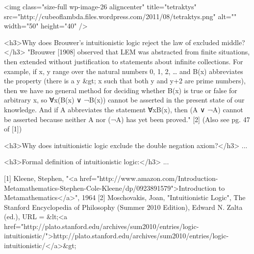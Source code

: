 <img class="size-full wp-image-26 aligncenter" title="tetraktys" src="http://cubeoflambda.files.wordpress.com/2011/08/tetraktys.png" alt="" width="50" height="40" />

<h3>Why does Brouwer's intuitionistic logic reject the law of excluded middle?</h3>
"Brouwer [1908] observed that LEM was abstracted from finite situations, then extended without justification to statements about infinite collections. For example, if x, y range over the natural numbers 0, 1, 2, … and B(x) abbreviates the property (there is a y &gt; x such that both y and y+2 are prime numbers), then we have no general method for deciding whether B(x) is true or false for arbitrary x, so ∀x(B(x) ∨ ¬B(x)) cannot be asserted in the present state of our knowledge. And if A abbreviates the statement ∀xB(x), then (A ∨ ¬A) cannot be asserted because neither A nor (¬A) has yet been proved." [2] (Also see pg. 47 of [1])

<h3>Why does intuitionistic logic exclude the double negation axiom?</h3>
...

<h3>Formal definition of intuitionistic logic:</h3>
...


[1] Kleene, Stephen, "<a href="http://www.amazon.com/Introduction-Metamathematics-Stephen-Cole-Kleene/dp/0923891579">Introduction to Metamathematics</a>", 1964
[2] Moschovakis, Joan, "Intuitionistic Logic", The Stanford Encyclopedia of Philosophy (Summer 2010 Edition), Edward N. Zalta (ed.), URL = &lt;<a href="http://plato.stanford.edu/archives/sum2010/entries/logic-intuitionistic/">http://plato.stanford.edu/archives/sum2010/entries/logic-intuitionistic/</a>&gt;
